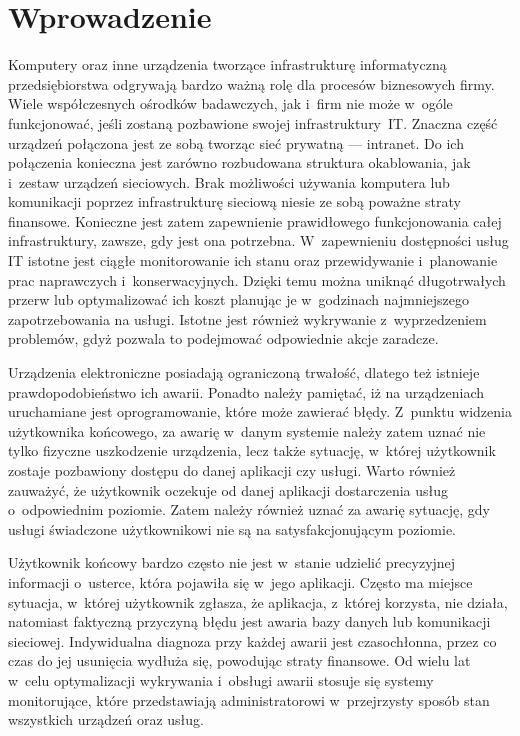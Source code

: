 \chapter{Wprowadzenie}

Komputery oraz inne urządzenia tworzące infrastrukturę informatyczną
przedsiębiorstwa odgrywają bardzo ważną rolę dla procesów biznesowych
firmy. Wiele współczesnych ośrodków badawczych, jak i~firm nie może
w~ogóle funkcjonować, jeśli zostaną pozbawione swojej
infrastruktury~IT. Znaczna część urządzeń połączona jest ze sobą
tworząc sieć prywatną --- intranet. Do ich połączenia konieczna jest
zarówno rozbudowana struktura okablowania, jak i~zestaw urządzeń
sieciowych. Brak możliwości używania komputera lub komunikacji poprzez
infrastrukturę sieciową niesie ze sobą poważne straty
finansowe. Konieczne jest zatem zapewnienie prawidłowego
funkcjonowania całej infrastruktury, zawsze, gdy jest ona
potrzebna. W~zapewnieniu dostępności usług IT istotne jest ciągłe
monitorowanie ich stanu oraz przewidywanie i~planowanie prac
naprawczych i~konserwacyjnych. Dzięki temu można uniknąć długotrwałych
przerw lub optymalizować ich koszt planując je w~godzinach
najmniejszego zapotrzebowania na usługi. Istotne jest również
wykrywanie z~wyprzedzeniem problemów, gdyż pozwala to podejmować
odpowiednie akcje zaradcze.

Urządzenia elektroniczne posiadają ograniczoną trwałość, dlatego też
istnieje prawdopodobieństwo ich awarii. Ponadto należy pamiętać, iż na
urządzeniach uruchamiane jest oprogramowanie, które może zawierać
błędy. Z~punktu widzenia użytkownika końcowego, za awarię w~danym
systemie należy zatem uznać nie tylko fizyczne uszkodzenie urządzenia,
lecz także sytuację, w~której użytkownik zostaje pozbawiony dostępu do
danej aplikacji czy usługi. Warto również zauważyć, że użytkownik
oczekuje od danej aplikacji dostarczenia usług o~odpowiednim
poziomie. Zatem należy również uznać za awarię sytuację, gdy usługi
świadczone użytkownikowi nie są na satysfakcjonującym poziomie.

Użytkownik końcowy bardzo często nie jest w~stanie udzielić
precyzyjnej informacji o~usterce, która pojawiła się w~jego
aplikacji. Często ma miejsce sytuacja, w~której użytkownik zgłasza, że
aplikacja, z~której korzysta, nie działa, natomiast faktyczną
przyczyną błędu jest awaria bazy danych lub komunikacji
sieciowej. Indywidualna diagnoza przy każdej awarii jest czasochłonna,
przez co czas do jej usunięcia wydłuża się, powodując straty
finansowe. Od wielu lat w~celu optymalizacji wykrywania i~obsługi
awarii stosuje się systemy monitorujące, które przedstawiają
administratorowi w~przejrzysty sposób stan wszystkich urządzeń oraz
usług.

